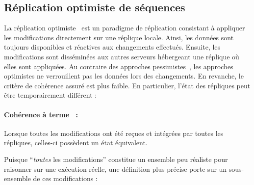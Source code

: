 
\subsection{Réplication optimiste de séquences}
\label{repl:subsec:optimistic}


La réplication optimiste~\cite{demers1987epidemic, johnson1975maintenance,
  ladin1992providing, saito2005optimistic} est un paradigme de réplication
consistant à appliquer les modifications directement sur une réplique locale.
Ainsi, les données sont toujours disponibles et réactives aux changements
effectués. Ensuite, les modifications sont disséminées aux autres serveurs
hébergeant une réplique où elles sont appliquées. Au contraire des approches
pessimistes~\cite{alsberg1976principle, gifford1979weighted}, les approches
optimistes ne verrouillent pas les données lors des changements. En revanche, le
critère de cohérence assuré est plus faible. En particulier, l'état des
répliques peut être temporairement différent :


\paragraph{Cohérence à terme~\cite{bailis2013eventual} :} Lorsque toutes les
modifications ont été reçues et intégrées par toutes les répliques, celles-ci
possèdent un état équivalent.

\noindent Puisque ``\emph{toutes} les modifications'' constitue un ensemble peu
réaliste pour raisonner sur une exécution réelle, une définition plus précise
porte sur un sous-ensemble de ces modifications :

